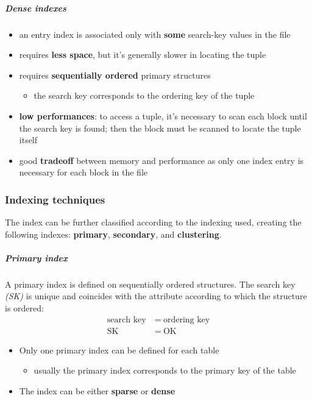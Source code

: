\documentclass[english]{article}
\begin{document}
\subparagraph*{Dense indexes}
\begin{itemize}
  \item an entry index is associated only with \textbf{some} search-key values in the file
  \item requires \textbf{less space}, but it's generally slower in locating the tuple
  \item requires\textbf{ sequentially ordered} primary structures
        \begin{itemize}[label=\(\rightarrow\)]
          \item the search key corresponds to the ordering key of the tuple
        \end{itemize}
  \item \textbf{low performances}: to access a tuple, it's necessary to scan each block until the search key is found; then the block must be scanned to locate the tuple itself
  \item good \textbf{tradeoff} between memory and performance as only one index entry is necessary for each block in the file
\end{itemize}

\subsubsection{Indexing techniques}

The index can be further classified according to the indexing used, creating the following indexes: \textbf{primary}, \textbf{secondary}, and \textbf{clustering}.

\subparagraph*{Primary index}
A primary index is defined on sequentially ordered structures.
The search key \textit{(SK)} is unique and coincides with the attribute according to which the structure is ordered:
\begin{align*}
  \text{search key} \  & = \ \text{ordering key} \\
  \text{SK} \          & = \ \text{OK}
\end{align*}

\begin{itemize}
  \item Only one primary index can be defined for each table
        \begin{itemize}
          \item usually the primary index corresponds to the primary key of the table
        \end{itemize}
  \item The index can be either \textbf{sparse} or \textbf{dense}
\end{itemize}
\end{document}
